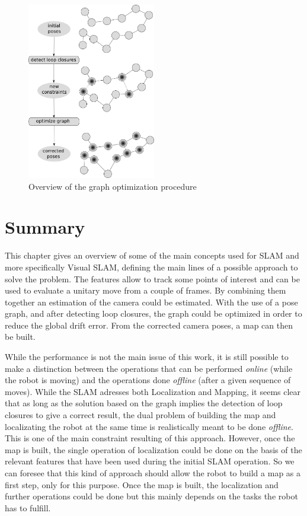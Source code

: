 \begin{figure}[H]
\centering
\includegraphics[width=0.5\textwidth]{figures/graph1}
\caption{Overview of the graph optimization procedure}
\end{figure}

\section{Summary}

This chapter gives an overview of some of the main concepts used for SLAM and more specifically Visual SLAM, defining the main lines of a possible approach to solve the problem. The features allow to track some points of interest and can be used to evaluate a unitary move from a couple of frames. By combining them together an estimation of the camera could be estimated. With the use of a pose graph, and after detecting loop closures, the graph could be optimized in order to reduce the global drift error. From the corrected camera poses, a map can then be built. 

While the performance is not the main issue of this work, it is still possible to make a distinction between the operations that can be performed \emph{online} (while the robot is moving) and the operations done \emph{offline} (after a given sequence of moves). While the SLAM adresses both Localization and Mapping, it seems clear that as long as the solution based on the graph implies the detection of loop closures to give a correct result, the dual problem of building the map and localizating the robot at the same time is realistically meant to be done \emph{offline}. This is one of the main constraint resulting of this approach. However, once the map is built, the single operation of localization could be done on the basis of the relevant features that have been used during the initial SLAM operation. So we can foresee that this kind of approach should allow the robot to build a map as a first step, only for this purpose. Once the map is built, the localization and further operations could be done but this mainly depends on the tasks the robot has to fulfill.

